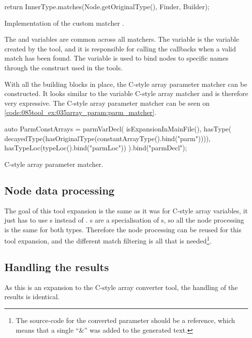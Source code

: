 \begin{listing}[H]
    \begin{cppcode}
return InnerType.matches(Node.getOriginalType(), Finder, Builder);
    \end{cppcode}
    \caption{Implementation of the custom matcher .}
    \label{code:085tool_ex:035array_param:match_impl}
\end{listing}

The  and  variables are common across all matchers. The  variable is the  variable created by the tool, and it is responsible for calling the callbacks when a valid match has been found. The  variable is used to bind nodes to specific names through the  construct used in the tools.

With all the building blocks in place, the C-style array parameter matcher can be constructed. It looks similar to the variable C-style array matcher and is therefore very expressive. The C-style array parameter matcher can be seen on \cref{code:085tool_ex:035array_param:parm_matcher}.

\begin{listing}[H]
    \begin{cppcode}
auto ParmConstArrays = parmVarDecl(
        isExpansionInMainFile(),
        hasType(
            decayedType(hasOriginalType(constantArrayType().bind("parm")))),
        hasTypeLoc(typeLoc().bind("parmLoc")) 
    ).bind("parmDecl");
    \end{cppcode}
    \caption{C-style array parameter matcher.}
    \label{code:085tool_ex:035array_param:parm_matcher}
\end{listing}

\subsection{Node data processing}

The goal of this tool expansion is the same as it was for C-style array variables, it just has to use s instead of . s are a specialisation of s, so all the node processing is the same for both types. Therefore the node processing can be reused for this tool expansion, and the different match filtering is all that is needed\footnote{The source-code for the converted  parameter should be a reference, which means that a single ``\&'' was added to the generated text.}.

\subsection{Handling the results}

As this is an expansion to the C-style array converter tool, the handling of the results is identical.